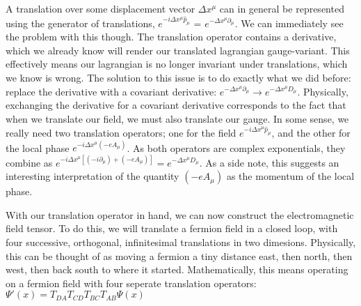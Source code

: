 \documentclass{article}
\begin{document}
        A translation over some displacement vector $\Delta x^\mu$ can in general be represented using the generator of translations,
        $e^{-i \Delta x^\mu \hat p_\mu}$ = $e^{- \Delta x^\mu \partial_\mu}$. We can immediately see the problem with this though. The translation operator contains a derivative, which we already know will render our translated lagrangian gauge-variant. This effectively means our lagrangian is no longer invariant under translations, which we know is wrong. The solution to this issue is to do exactly what we did before: replace the derivative with a covariant derivative:
        $e^{- \Delta x^\mu \partial_\mu} \rightarrow e^{- \Delta x^\mu D_\mu}$.
        Physically, exchanging the derivative for a covariant derivative corresponds to the fact that when we translate our field, we must also translate our gauge. In some sense, we really need two translation operators; one for the field
        $e^{-i \Delta x^\mu \hat p_\mu}$, and the other for the local phase
        $e^{-i \Delta x^\mu (-e A_\mu)}$. As both operators are complex exponentials, they combine as 
        $e^{-i \Delta x^\mu [( -i \partial_\mu) + (-e A_\mu)]} = e^{ - \Delta x^\mu D_\mu }$. As a side note, this suggests an interesting interpretation of the quantity $( -e A_\mu )$ as the momentum of the local phase.

        With our translation operator in hand, we can now construct the electromagnetic field tensor. To do this, we will translate a fermion field in a closed loop, with four successive, orthogonal, infinitesimal translations in two dimesions. Physically, this can be thought of as moving a fermion a tiny distance east, then north, then west, then back south to where it started. Mathematically, this means operating on a fermion field with four seperate translation operators:
        $ \Psi'(x) = T_{DA} T_{CD} T_{BC} T_{AB} \Psi(x) $

        \vspace{5pt}
        \begin{center}  \end{center}
        \vspace{5pt}
        
\end{document}
